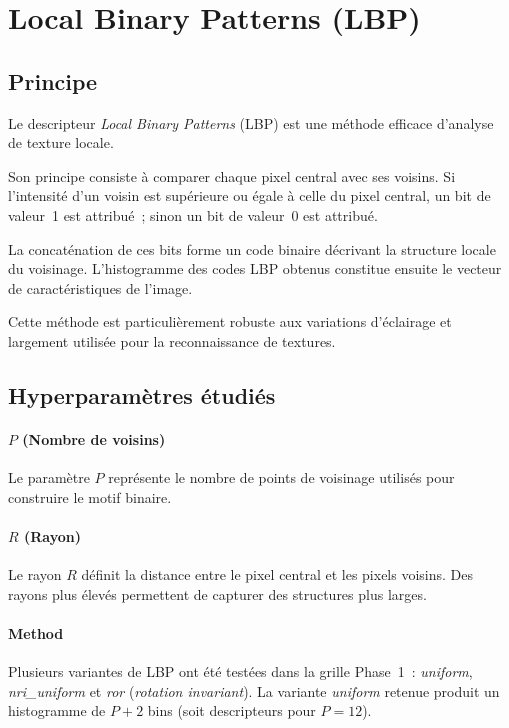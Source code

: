 \section{Local Binary Patterns (LBP)}

\subsection{Principe}

Le descripteur \emph{Local Binary Patterns} (LBP) est une méthode efficace d'analyse de texture
locale.

Son principe consiste à comparer chaque pixel central avec ses voisins. Si l'intensité d'un
voisin est supérieure ou égale à celle du pixel central, un bit de valeur~1 est attribué~;
sinon un bit de valeur~0 est attribué.

La concaténation de ces bits forme un code binaire décrivant la structure locale du voisinage.
L'histogramme des codes LBP obtenus constitue ensuite le vecteur de caractéristiques de
l'image.

Cette méthode est particulièrement robuste aux variations d'éclairage et largement utilisée
pour la reconnaissance de textures.

\subsection{Hyperparamètres étudiés}

\paragraph{$P$ (Nombre de voisins)}
Le paramètre $P$ représente le nombre de points de voisinage utilisés pour construire le motif
binaire.

\paragraph{$R$ (Rayon)}
Le rayon $R$ définit la distance entre le pixel central et les pixels voisins. Des rayons plus
élevés permettent de capturer des structures plus larges.

\paragraph{Method}
Plusieurs variantes de LBP ont été testées dans la grille Phase~1~: \emph{uniform},
\emph{nri\_uniform} et \emph{ror} (\emph{rotation invariant}). La variante \emph{uniform}
retenue produit un histogramme de $P+2$ bins (soit \dimLBP{} descripteurs pour $P=12$).

